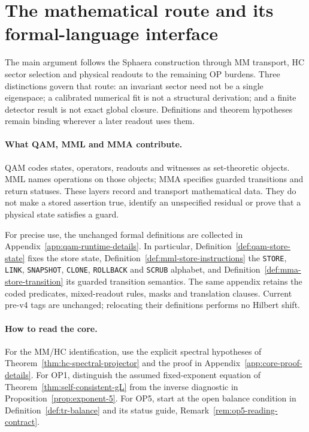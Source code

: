 \section*{The mathematical route and its formal-language interface}
\label{sec:compact-qam-interface}

The main argument follows the Sphaera construction through MM transport,
HC sector selection and physical readouts to the remaining OP burdens.
Three distinctions govern that route: an invariant sector need not be
a single eigenspace; a calibrated numerical fit is not a structural
derivation; and a finite detector result is not exact global closure.
Definitions and theorem hypotheses remain binding wherever a later
readout uses them.

\paragraph{What QAM, MML and MMA contribute.}
QAM codes states, operators, readouts and witnesses as set-theoretic
objects. MML names operations on those objects; MMA specifies guarded
transitions and return statuses. These layers record and transport
mathematical data. They do not make a stored assertion true, identify
an unspecified residual or prove that a physical state satisfies a guard.

For precise use, the unchanged formal definitions are collected in
Appendix~\ref{app:qam-runtime-details}. In particular,
Definition~\ref{def:qam-store-state} fixes the store state,
Definition~\ref{def:mml-store-instructions} the
\texttt{STORE}, \texttt{LINK}, \texttt{SNAPSHOT}, \texttt{CLONE},
\texttt{ROLLBACK} and \texttt{SCRUB}
alphabet, and Definition~\ref{def:mma-store-transition} its guarded
transition semantics. The same appendix retains the coded predicates,
mixed-readout rules, masks and translation clauses. Current pre-v4 tags
are unchanged; relocating their definitions performs no Hilbert shift.

\paragraph{How to read the core.}
For the MM/HC identification, use the explicit spectral hypotheses of
Theorem~\ref{thm:hc-spectral-projector} and the proof in
Appendix~\ref{app:core-proof-details}. For OP1, distinguish the assumed
fixed-exponent equation of Theorem~\ref{thm:self-consistent-gL} from
the inverse diagnostic in Proposition~\ref{prop:exponent-5}. For OP5,
start at the open balance condition in Definition~\ref{def:tr-balance}
and its status guide, Remark~\ref{rem:op5-reading-contract}.

